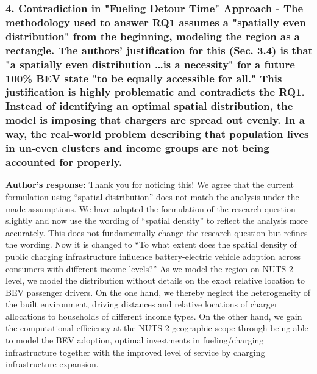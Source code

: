 \documentclass[11pt]{article}
\begin{document}
\subsubsection*{4. Contradiction in "Fueling Detour Time" Approach - The methodology used to answer RQ1 assumes a "spatially even distribution" from the beginning, modeling the region as a rectangle. The authors' justification for this (Sec. 3.4) is that "a spatially even distribution \dots is a necessity" for a future 100\% BEV state "to be equally accessible for all." This justification is highly problematic and contradicts the RQ1. Instead of identifying an optimal spatial distribution, the model is imposing that chargers are spread out evenly. In a way, the real-world problem describing that population lives in un-even clusters and income groups are not being accounted for properly.}
\color{authorblue}
\noindent \textcolor{authorblue}{\textbf{Author's response:}} Thank you for noticing this! We agree that the current formulation using “spatial distribution” does not match the analysis under the made assumptions. We have adapted the formulation of the research question slightly and now use the wording of “spatial density” to reflect the analysis more accurately. This does not fundamentally change the research question but refines the wording. Now it is changed to “To what extent does the spatial density of public charging infrastructure influence battery-electric vehicle adoption across consumers with different income levels?” 
As we model the region on NUTS-2 level, we model the distribution without details on the exact relative location to BEV passenger drivers. On the one hand, we thereby neglect the heterogeneity of the built environment, driving distances and relative locations of charger allocations to households of different income types. On the other hand, we gain the computational efficiency at the NUTS-2 geographic scope through being able to model the BEV adoption, optimal investments in fueling/charging infrastructure together with the improved level of service by charging infrastructure expansion. \\
\color{reviewergrey}
\end{document}
